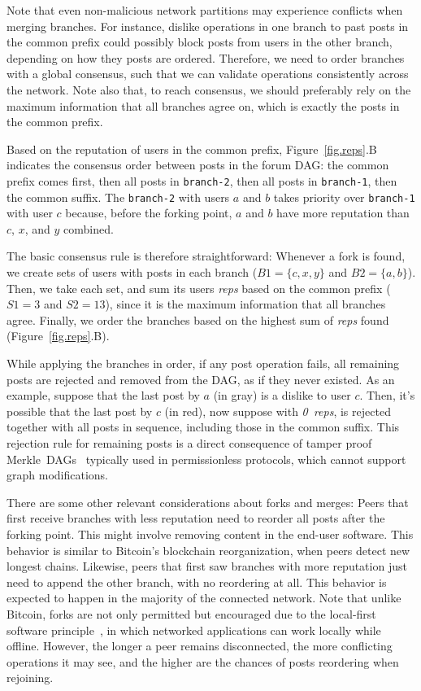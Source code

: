 \documentclass[12pt]{article}
\newcommand{\reps}     {\emph{reps}\xspace}
\newcommand{\nreps}[1] {\emph{#1~reps\xspace}}
\newcommand{\code}[1]  {\texttt{\footnotesize{#1}}}
\begin{document}
Note that even non-malicious network partitions may experience conflicts when
merging branches.
For instance, dislike operations in one branch to past posts in the common
prefix could possibly block posts from users in the other branch, depending on
how they posts are ordered.
Therefore, we need to order branches with a global consensus, such that we can
validate operations consistently across the network.
%
Note also that, to reach consensus, we should preferably rely on the maximum
information that all branches agree on, which is exactly the posts in the
common prefix.

Based on the reputation of users in the common prefix, Figure~\ref{fig.reps}.B
indicates the consensus order between posts in the forum DAG:
    the common prefix comes first,
    then all posts in \code{branch-2},
    then all posts in \code{branch-1},
    then the common suffix.
%
The \code{branch-2} with users $a$ and $b$ takes priority over \code{branch-1}
with user $c$ because, before the forking point, $a$ and $b$ have more
reputation than $c$, $x$, and $y$ combined.

The basic consensus rule is therefore straightforward:
Whenever a fork is found, we create sets of users with posts in each branch
($B1=\{c,x,y\}$ and $B2=\{a,b\}$).
Then, we take each set, and sum its users \reps based on the common prefix
($S1=3$ and $S2=13$), since it is the maximum information that all branches
agree.
Finally, we order the branches based on the highest sum of \reps found
(Figure~\ref{fig.reps}.B).

While applying the branches in order, if any post operation fails, all
remaining posts are rejected and removed from the DAG, as if they never
existed.
As an example, suppose that the last post by $a$ (in gray) is a dislike to user
$c$.
Then, it's possible that the last post by $c$ (in red), now suppose with
\nreps{0}, is rejected together with all posts in sequence, including those in
the common suffix.
%
This rejection rule for remaining posts is a direct consequence of tamper proof
Merkle~DAGs~\cite{p2p.ipfs,p2p.bitcoin} typically used in permissionless
protocols, which cannot support graph modifications.

There are some other relevant considerations about forks and merges:
%
Peers that first receive branches with less reputation need to reorder all
posts after the forking point.
This might involve removing content in the end-user software.
This behavior is similar to Bitcoin's blockchain reorganization, when peers
detect new longest chains. %
%
Likewise, peers that first saw branches with more reputation just need to
append the other branch, with no reordering at all.
This behavior is expected to happen in the majority of the connected network.
%
Note that unlike Bitcoin, forks are not only permitted but encouraged due to
the local-first software principle~\cite{p2p.local}, in which networked
applications can work locally while offline.
However, the longer a peer remains disconnected, the more conflicting
operations it may see, and the higher are the chances of posts reordering when
rejoining.
\end{document}
